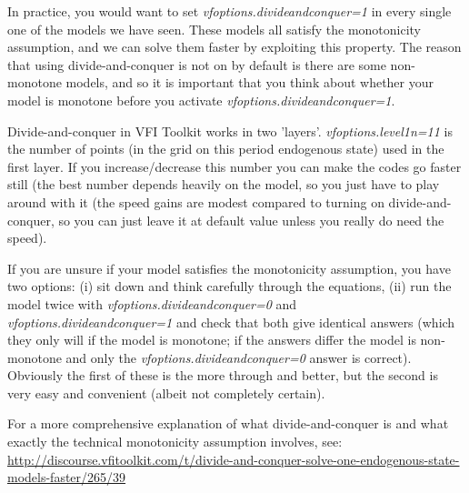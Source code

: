 In practice, you would want to set \textit{vfoptions.divideandconquer=1} in every single one of the models we have seen. These models all satisfy the monotonicity assumption, and we can solve them faster by exploiting this property. The reason that using divide-and-conquer is not on by default is there are some non-monotone models, and so it is important that you think about whether your model is monotone before you activate \textit{vfoptions.divideandconquer=1}.

Divide-and-conquer in VFI Toolkit works in two 'layers'. \textit{vfoptions.level1n=11} is the number of points (in the grid on this period endogenous state) used in the first layer. If you increase/decrease this number you can make the codes go faster still (the best number depends heavily on the model, so you just have to play around with it (the speed gains are modest compared to turning on divide-and-conquer, so you can just leave it at default value unless you really do need the speed).

If you are unsure if your model satisfies the monotonicity assumption, you have two options: (i) sit down and think carefully through the equations, (ii) run the model twice with \textit{vfoptions.divideandconquer=0} and \textit{vfoptions.divideandconquer=1} and check that both give identical answers (which they only will if the model is monotone; if the answers differ the model is non-monotone and only the \textit{vfoptions.divideandconquer=0} answer is correct). Obviously the first of these is the more through and better, but the second is very easy and convenient (albeit not completely certain).

For a more comprehensive explanation of what divide-and-conquer is and what exactly the technical monotonicity assumption involves, see:
\href{http://discourse.vfitoolkit.com/t/divide-and-conquer-solve-one-endogenous-state-models-faster/265/39}{http://discourse.vfitoolkit.com/t/divide-and-conquer-solve-one-endogenous-state-models-faster/265/39}
















